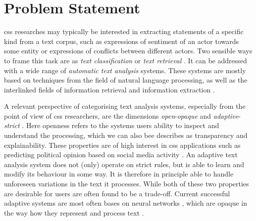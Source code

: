 \documentclass[11pt]{scrreprt}
\let\cite\parencite  %
\begin{document}
%

\chapter{Problem Statement}
\label{cha:problem-statement}

\gls{css} researches may typically be interested in extracting statements of a specific kind from a text corpus, such as expressions of sentiment of an actor towards some entity or expressions of conflicts between different actors. Two sensible ways to frame this task are as \textit{text classification} \cite{kowsariTextClassificationAlgorithms2019} or \textit{text retrieval} \cite{manningIntroductionInformationRetrieval2008}. It can be addressed with a wide range of \textit{automatic text analysis} systems. These systems are mostly based on techniques from the field of natural language processing, as well as the interlinked fields of information retrieval and information extraction \cite{chowdharyNaturalLanguageProcessing2020}.

A relevant perspective of categorising text analysis systems, especially from the point of view of \gls{css} researchers, are the dimensions \textit{open}-\textit{opaque} and \textit{adaptive}-\textit{strict} \cite{menezesSemanticHypergraphs2021}. Here openness refers to the systems users ability to inspect and understand the processing, which we can also bee describes as transparency and explainability. These properties are of high interest in \gls{css} applications such as predicting political opinion based on social media activity \cite{wilkersonLargeScaleComputerizedText2017}. An adaptive text analysis system does not (only) operate on strict rules, but is able to learn and modify its behaviour in some way. It is therefore in principle able to handle unforeseen variations in the text it processes. While both of these two properties are desirable for users are often found to be a trade-off. Current successful adaptive systems are most often bases on neural networks \cite{hirschbergAdvancesNaturalLanguage2015}, which are opaque in the way how they represent and process text \cite{rudinStopExplainingBlack2019}.
\end{document}
